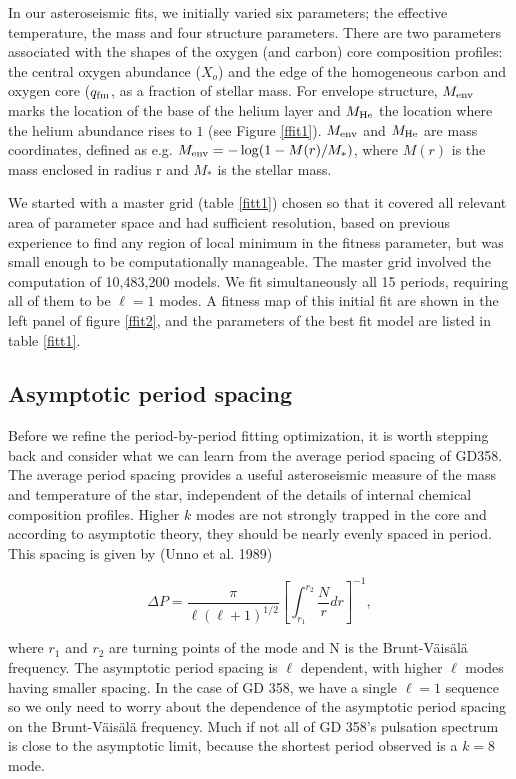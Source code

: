 \documentclass[12pt,preprint]{aastex}
\newcommand{\bvf}{Brunt-V\"ais\"al\"a }
\begin{document}
In our asteroseismic fits, we initially varied six parameters; the effective temperature, 
the mass and four structure parameters. There are two parameters associated with the shapes 
of the oxygen (and carbon) core composition profiles: the central oxygen abundance ($X_o$) and 
the edge of the homogeneous carbon and oxygen core ($q_{\rm fm}$, as a fraction of stellar mass. 
For envelope structure, $M_{\rm env}$ marks the location of the base of the helium layer 
and $M_{\rm He}$ the location where the helium abundance rises to $1$ (see Figure \ref{ffit1}). 
$M_{\rm env}$ and $M_{\rm He}$ are mass coordinates, defined as e.g. 
$M_{\rm env} = -\log(1 - M(r)/M_*)$, where $M(r)$ is the mass enclosed in radius r and 
$M_*$ is the stellar mass. 

We started with a master grid (table \ref{fitt1}) chosen so that it covered all relevant 
area of parameter space and had sufficient resolution, based on previous experience 
\citep{Bischoff-Kim11a,Bischoff-Kim14} to find any region of local minimum in the fitness parameter, 
but was small enough to be computationally manageable. The master grid involved the computation 
of 10,483,200 models. We fit simultaneously all 15 periods, requiring all of them to be $\ell=1$ 
modes. A fitness map of this initial fit are shown in the left panel of figure \ref{ffit2}, and the parameters of the best fit model are listed in table \ref{fitt1}.

\subsection{Asymptotic period spacing}
\label{periodspacing}

Before we refine the period-by-period fitting optimization, it is worth stepping back and consider 
what we can learn from the average period spacing of GD358. The average period spacing provides a 
useful asteroseismic measure of the mass and temperature of the star, independent of the details of 
internal chemical composition profiles. Higher $k$ modes are not strongly trapped in the core and 
according to asymptotic theory, they should be nearly evenly spaced in period. This spacing is 
given by (Unno et al. 1989)

\begin{equation}
\label{fiteq2}
\Delta P = \frac{\pi}{\ell(\ell + 1)^{1/2}}\left[\int_{r_1}^{r_2}\frac{N}{r}dr\right]^{-1},
\end{equation}

\noindent
where $r_1$ and $r_2$ are turning points of the mode and N is the Brunt-V\"{a}is\"{a}l\"{a} frequency. 
The asymptotic period spacing is $\ell$ dependent, with higher $\ell$ modes having smaller spacing. 
In the case of GD 358, we have a single $\ell=1$ sequence so we only need to worry about the dependence 
of the asymptotic period spacing on the \bvf frequency. Much if not all of GD 358's pulsation 
spectrum is close to the asymptotic limit, because the shortest period observed is a $k=8$ mode.
\end{document}
